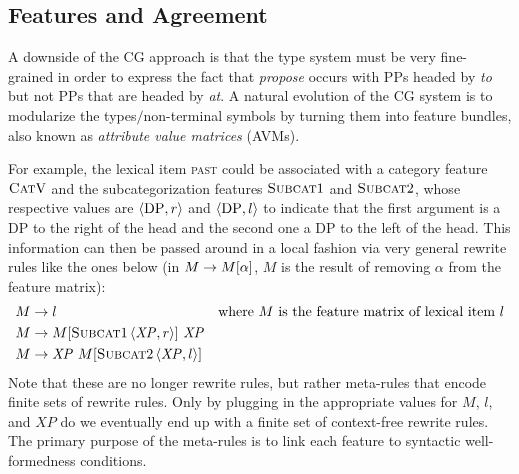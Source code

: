 \subsection{Features and Agreement}
A downside of the CG approach is that the type system must be very fine-grained in order to express the fact that \emph{propose} occurs with PPs headed by \emph{to} but not PPs that are headed by \emph{at}.
A natural evolution of the CG system is to modularize the types$/$non-terminal symbols by turning them into feature bundles, also known as \emph{attribute value matrices} (AVMs).

For example, the lexical item \textsc{past} could be associated with a category feature $\text{\textsc{Cat}} \mathrm{V}$ and the subcategorization features $\text{\textsc{Subcat}}1$ and $\text{\textsc{Subcat}}2$, whose respective values are $\left \langle \mathrm{DP},r \right \rangle $ and $\left \langle \mathrm{DP},l \right \rangle $ to indicate that the first argument is a DP to the right of the head and the second one a DP to the left of the head.
This information can then be passed around in a local fashion via very general rewrite rules like the ones below (in $M \rightarrow M[\alpha]$, $M$ is the result of removing $\alpha$ from the feature matrix):
%
\begin{align*}
    M & \rightarrow l & \text{where $M$ is the feature matrix of lexical item $l$}\\
    M & \rightarrow M[\text{\textsc{Subcat}}1 \left \langle \mathit{XP},r \right \rangle ]\ \mathit{XP}\\
    M & \rightarrow \mathit{XP}\ M[\text{\textsc{Subcat}}2 \left \langle \mathit{XP},l \right \rangle ]
\end{align*}
%
Note that these are no longer rewrite rules, but rather meta-rules that encode finite sets of rewrite rules.
Only by plugging in the appropriate values for $M$, $l$, and $\mathit{XP}$ do we eventually end up with a finite set of context-free rewrite rules.
The primary purpose of the meta-rules is to link each feature to syntactic well-formedness conditions.

